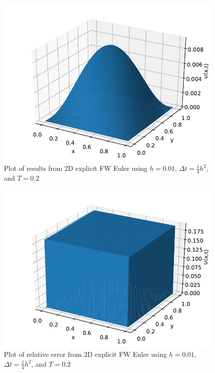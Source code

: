 \documentclass[%
oneside,                 %
final,                   %
10pt]{article}
\begin{document}
\begin{figure}[!htb]
        \centering 
         \includegraphics[scale=.7]{../Results/2dnumerical.pdf} 
        \caption{Plot of results from 2D explicit FW Euler using $h=0.01$, $\Delta t=\frac{1}{4} h^2$, and $T=0.2$}
        \label{fig:2dnumerical}   
\end{figure}  


\begin{figure}[!htb]
        \centering 
         \includegraphics[scale=.7]{../Results/2drelerr.pdf} 
        \caption{Plot of relative error from 2D explicit FW Euler using $h=0.01$, $\Delta t=\frac{1}{4} h^2$, and $T=0.2$}
        \label{fig:2drelerr}   
\end{figure}  
\end{document}
